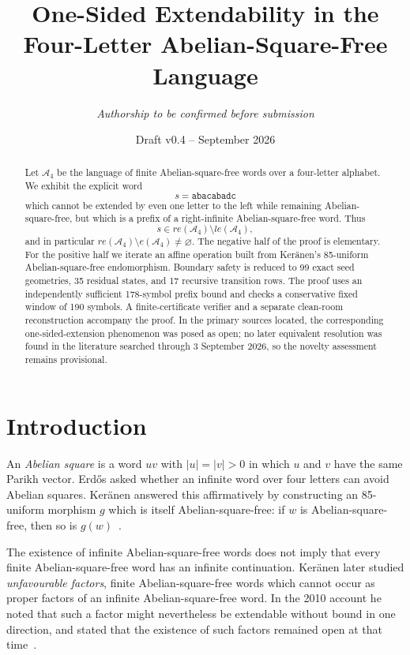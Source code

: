 \documentclass[11pt]{article}
\title{One-Sided Extendability in the Four-Letter Abelian-Square-Free Language}
\author{\textit{Authorship to be confirmed before submission}}
\date{Draft v0.4 -- September 2026}
\theoremstyle{definition}
\newcommand{\A}{\mathcal A_4}
\newcommand{\code}[1]{\texttt{#1}}
\begin{document}
\maketitle

\begin{abstract}
Let $\A$ be the language of finite Abelian-square-free words over a four-letter alphabet. We exhibit the explicit word
\[
s=\code{abacabadc}
\]
which cannot be extended by even one letter to the left while remaining Abelian-square-free, but which is a prefix of a right-infinite Abelian-square-free word. Thus
\[
s\in re(\A)\setminus le(\A),
\]
and in particular $re(\A)\setminus e(\A)\neq\varnothing$. The negative half of the proof is elementary. For the positive half we iterate an affine operation built from Ker\"anen's 85-uniform Abelian-square-free endomorphism. Boundary safety is reduced to 99 exact seed geometries, 35 residual states, and 17 recursive transition rows. The proof uses an independently sufficient 178-symbol prefix bound and checks a conservative fixed window of 190 symbols. A finite-certificate verifier and a separate clean-room reconstruction accompany the proof. In the primary sources located, the corresponding one-sided-extension phenomenon was posed as open; no later equivalent resolution was found in the literature searched through 3 September 2026, so the novelty assessment remains provisional.
\end{abstract}

\section{Introduction}

An \emph{Abelian square} is a word $uv$ with $|u|=|v|>0$ in which $u$ and $v$ have the same Parikh vector. Erd\H{o}s asked whether an infinite word over four letters can avoid Abelian squares. Ker\"anen answered this affirmatively by constructing an 85-uniform morphism $g$ which is itself Abelian-square-free: if $w$ is Abelian-square-free, then so is $g(w)$~\cite{Keranen1992}.

The existence of infinite Abelian-square-free words does not imply that every finite Abelian-square-free word has an infinite continuation. Ker\"anen later studied \emph{unfavourable factors}, finite Abelian-square-free words which cannot occur as proper factors of an infinite Abelian-square-free word. In the 2010 account he noted that such a factor might nevertheless be extendable without bound in one direction, and stated that the existence of such factors remained open at that time~\cite{Keranen2010}.
\end{document}
